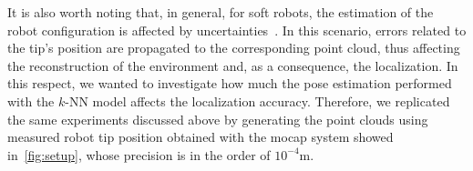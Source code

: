 It is also worth noting that, in general, for soft robots, the estimation of the robot configuration is affected by uncertainties~\cite{della2023model}. In this scenario, errors related to the tip's position are propagated to the corresponding point cloud, thus affecting the reconstruction of the environment and, as a consequence, the localization.
In this respect, we wanted to investigate how much the pose estimation performed with the $k$-NN model affects the localization accuracy. Therefore, we replicated the same experiments discussed above by generating the point clouds using measured robot tip position obtained with the \gls{mocap} system showed in~\cref{fig:setup}, whose precision is in the order of $10^{-4}$m.
 